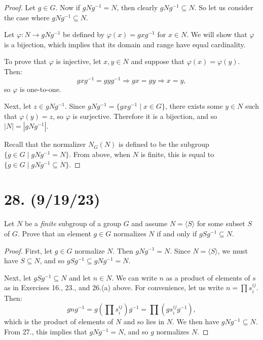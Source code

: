 \documentclass{article}
\begin{document}
\begin{proof}
    Let $g \in G$. Now if $gNg^{-1} = N$, then clearly $gNg^{-1} \subseteq N$. So let us consider the case where $gNg^{-1} \subseteq N$. 
    
    Let $\varphi: N \rightarrow gNg^{-1}$ be defined by $\varphi(x) = gxg^{-1}$ for $x \in N$. We will show that $\varphi$ is a bijection, which implies that its domain and range have equal cardinality.

    To prove that $\varphi$ is injective, let $x, y \in N$ and suppose that $\varphi(x) = \varphi(y)$. Then:
    \begin{equation*}
        gxg^{-1} = gyg^{-1} \Rightarrow gx = gy \Rightarrow x = y,
    \end{equation*}
    so $\varphi$ is one-to-one.

    Next, let $z \in gNg^{-1}$. Since $gNg^{-1} = \{ gxg^{-1} \mid x \in G \}$, there exists some $y \in N$ such that $\varphi(y) = z$, so $\varphi$ is surjective. Therefore it is a bijection, and so $|N| = |gNg^{-1}|$.

    Recall that the normalizer $N_G(N)$ is defined to be the subgroup $\{ g \in G \mid gNg^{-1} = N \}$. From above, when $N$ is finite, this is equal to $\{ g \in G \mid gNg^{-1} \subseteq N \}$.
\end{proof}

\section*{28. (9/19/23)}

Let $N$ be a \emph{finite} subgroup of a group $G$ and assume $N = \langle S \rangle$ for some subset $S$ of $G$. Prove that an element $g \in G$ normalizes $N$ if and only if $gSg^{-1} \subseteq N$.

\begin{proof}
    First, let $g \in G$ normalize $N$. Then $gNg^{-1} = N$. Since $N = \langle S \rangle$, we must have $S \subseteq N$, and so $gSg^{-1} \subseteq gNg^{-1} = N$.

    Next, let $gSg^{-1} \subseteq N$ and let $n \in N$. We can write $n$ as a product of elements of $s$ as in Exercises 16., 23., and 26.(a) above. For convenience, let us write $n = \prod s_i^{ij}$. Then:
    \begin{equation*}
        gng^{-1} = g (\prod s_i^{ij}) g^{-1} = \prod (g s_i^{ij} g^{-1}),
    \end{equation*}
    which is the product of elements of $N$ and so lies in $N$. We then have $gNg^{-1} \subseteq N$. From 27., this implies that $gNg^{-1} = N$, and so $g$ normalizes $N$.
\end{proof}
\end{document}
